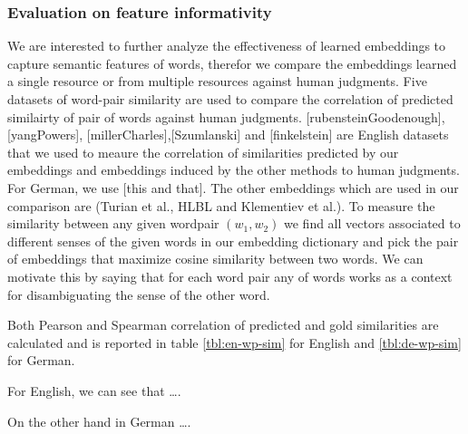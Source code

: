 \subsubsection{Evaluation on feature informativity}
\label{ssec:ent-link-extrinsic}
 \label{exp:word-similarity}
 We are interested to further analyze the effectiveness of learned embeddings to capture semantic features of words, therefor 
 we compare the embeddings learned a single resource or from multiple resources against human judgments.
 Five datasets of word-pair similarity are used to compare the correlation of predicted similairty of 
 pair of words against human judgments.
 [rubensteinGoodenough], [yangPowers], [millerCharles],[Szumlanski] and [finkelstein] are English datasets that we used 
 to meaure the correlation of similarities
 predicted by our embeddings and  embeddings induced by the other methods to human judgments. 
 For German, we use [this and that].
 The other embeddings which are used in our comparison are (Turian et al., HLBL and Klementiev et al.).
 To measure the similarity between any given wordpair $(w_1 , w_2)$ we find all vectors associated to different senses
 of the given words in our embedding dictionary and pick the pair of embeddings that maximize cosine similarity between two words. 
 We can motivate this by saying that for each word pair any of words works as a context for disambiguating the sense of the other word.
  
 Both Pearson and Spearman correlation of predicted and gold similarities 
 are calculated and is reported in table \ref{tbl:en-wp-sim} for English and \ref{tbl:de-wp-sim} for German.
 
 For English, we can see that \ldots.
 
 On the other hand in German \ldots. 
 
